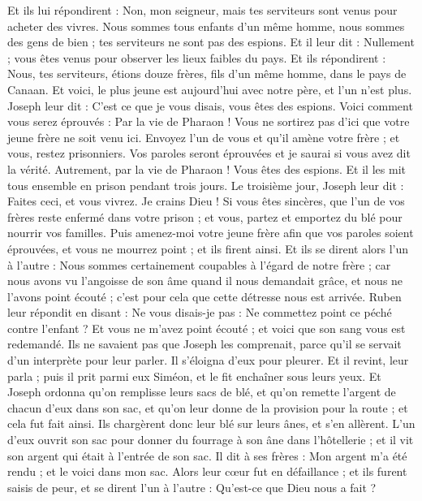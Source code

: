 \begin{multicols}{2}
Et ils lui répondirent : Non, mon seigneur, mais tes serviteurs sont venus pour acheter des vivres.
Nous sommes tous enfants d'un même homme, nous sommes des gens de bien ; tes serviteurs ne sont pas des espions.
Et il leur dit : Nullement ; vous êtes venus pour observer les lieux faibles du pays.
Et ils répondirent : Nous, tes serviteurs, étions douze frères, fils d'un même homme, dans le pays de Canaan. Et voici, le plus jeune est aujourd'hui avec notre père, et l'un n'est plus.
Joseph leur dit : C'est ce que je vous disais, vous êtes des espions.
Voici comment vous serez éprouvés : Par la vie de Pharaon ! Vous ne sortirez pas d'ici que votre jeune frère ne soit venu ici.
Envoyez l’un de vous et qu’il amène votre frère ; et  vous, restez prisonniers. Vos paroles seront éprouvées et je saurai si vous avez dit la vérité. Autrement, par la vie de Pharaon ! Vous êtes des espions.
Et il les mit tous ensemble en prison pendant trois jours.
Le troisième jour, Joseph leur dit : Faites ceci, et vous vivrez. Je crains Dieu !
Si vous êtes sincères, que l'un de vos frères reste enfermé dans votre prison ; et vous, partez et emportez du blé pour nourrir vos familles.
Puis amenez-moi votre jeune frère afin que vos paroles soient éprouvées, et vous ne mourrez point ; et ils firent ainsi.
Et ils se dirent alors l'un à l'autre : Nous sommes certainement coupables à l'égard de notre frère ; car nous avons vu l'angoisse de son âme quand il nous demandait grâce, et nous ne l'avons point écouté ; c'est pour cela que cette détresse nous est arrivée.
Ruben leur répondit en disant : Ne vous disais-je pas : Ne commettez point ce péché contre l'enfant ? Et vous ne m’avez point écouté ; et voici que son sang vous est redemandé.
Ils ne savaient pas que Joseph les comprenait, parce qu'il se servait d’un interprète pour leur parler.
Il s’éloigna d’eux pour pleurer. Et il revint, leur parla ; puis il prit parmi eux Siméon, et le fit enchaîner sous leurs yeux.
Et Joseph ordonna qu'on remplisse leurs sacs de blé, et qu'on remette l'argent de chacun d’eux dans son sac, et qu'on leur donne de la provision pour la route ; et cela fut fait ainsi.
Ils chargèrent donc leur blé sur leurs ânes, et s'en allèrent.
L’un d'eux ouvrit son sac pour donner du fourrage à son âne dans l'hôtellerie ; et il vit son argent qui était à l’entrée de son sac.
Il dit à ses frères : Mon argent m'a été rendu ; et le voici dans mon sac. Alors leur cœur fut en défaillance ; et ils furent saisis de peur, et se dirent l'un à l'autre : Qu'est-ce que Dieu nous a fait ?

\end{multicols}
